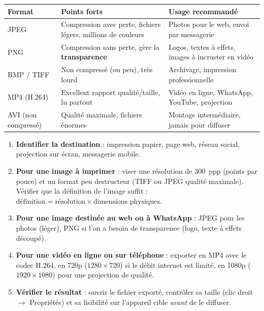 \documentclass[11pt]{article}
\begin{document}
\begin{center}
\begin{tabularx}{\linewidth}{|l|X|X|}
\hline
\rowcolor{popblueL} \textbf{Format} & \textbf{Points forts} & \textbf{Usage recommandé} \\
\hline
JPEG & Compression avec perte, fichiers légers, millions de couleurs & Photos pour le web, envoi par messagerie \\
\hline
PNG & Compression sans perte, gère la \textbf{transparence} & Logos, textes à effets, images à incruster en vidéo \\
\hline
BMP / TIFF & Non compressé (ou peu), très lourd & Archivage, impression professionnelle \\
\hline
MP4 (H.264) & Excellent rapport qualité/taille, lu partout & Vidéo en ligne, WhatsApp, YouTube, projection \\
\hline
AVI (non compressé) & Qualité maximale, fichiers énormes & Montage intermédiaire, jamais pour diffuser \\
\hline
\end{tabularx}
\end{center}

\begin{methode}
\begin{enumerate}
\item \textbf{Identifier la destination} : impression papier, page web, réseau social, projection sur écran, messagerie mobile.
\item \textbf{Pour une image à imprimer} : viser une résolution de \SI{300}{ppp} (points par pouce) et un format peu destructeur (TIFF ou JPEG qualité maximale). Vérifier que la définition de l'image suffit : $\text{définition} = \text{résolution} \times \text{dimensions physiques}$.
\item \textbf{Pour une image destinée au web ou à WhatsApp} : JPEG pour les photos (léger), PNG si l'on a besoin de transparence (logo, texte à effets découpé).
\item \textbf{Pour une vidéo en ligne ou sur téléphone} : exporter en MP4 avec le codec H.264, en 720p ($1280 \times 720$) si le débit internet est limité, en 1080p ($1920 \times 1080$) pour une projection de qualité.
\item \textbf{Vérifier le résultat} : ouvrir le fichier exporté, contrôler sa taille (clic droit $\rightarrow$ Propriétés) et sa lisibilité sur l'appareil cible \emph{avant} de le diffuser.
\end{enumerate}
\end{methode}
\end{document}
